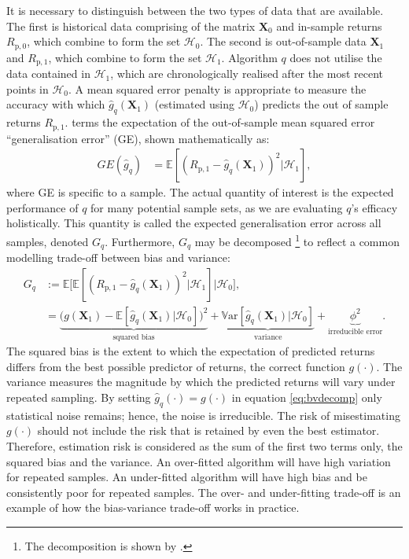 \documentclass[
]{article}
\begin{document}
It is necessary to distinguish between the two types of data that are available. The first is
historical data comprising of the matrix \(\textbf{X}_0\) and in-sample returns \(R_{\mathrm{p}, 0}\),
which combine to form the set \(\mathcal{H}_0\). The second is out-of-sample data \(\textbf{X}_1\) and
\(R_\mathrm{p, 1}\), which combine to form the set \(\mathcal{H}_1\). Algorithm \(q\) does not utilise the
data contained in \(\mathcal{H}_1\), which are chronologically realised after the most recent points in
\(\mathcal{H}_0\). A mean squared error penalty is appropriate to measure the accuracy with which
\(\hat{g}_q (\textbf{X}_1)\) (estimated using \(\mathcal{H}_0\)) predicts the out of sample returns
\(R_\mathrm{p, 1}\). \citet{K18} terms the expectation of the out-of-sample mean squared error
``generalisation error'' (GE), shown mathematically as:
\begin{align}
GE(\hat{g}_q) & = \mathbb{E}[(R_\mathrm{p, 1} - \hat{g}_q (\textbf{X}_1))^2|{\mathcal{H}_1}],
\end{align}
where GE is specific to a sample. The actual quantity of interest is the expected performance of \(q\)
for many potential sample sets, as we are evaluating \(q\)'s efficacy holistically. This quantity is
called the expected generalisation error across all samples, denoted \(G_q\). Furthermore, \(G_q\) may be
decomposed \footnote{The decomposition is shown by \citet{FHT01}.} to reflect a common modelling trade-off between
bias and variance:
\begin{align}
G_q &:= \mathbb{E} \Big [ \mathbb{E}[(R_\mathrm{p, 1} - \hat{g}_q (\textbf{X}_1))^2|{\mathcal{H}_1}] \Big | \mathcal{H}_0\Big ] , \\
& = \underbrace{ \Big (g(\textbf{X}_1) - \mathbb{E}[\hat{g}_q (\textbf{X}_1)|\mathcal{H}_0] \Big )^2}_{\text{squared bias}} + \underbrace{\mathbb{V}\mathrm{ar} [\hat{g}_q(\textbf{X}_1)|\mathcal{H}_0]}_{\text{variance}} + \underbrace{\phi^2}_{\text{irreducible error}}.\label{eq:bvdecomp}
\end{align}
The squared bias is the extent to which the expectation of predicted returns differs from the best
possible predictor of returns, the correct function \(g(\cdot)\). The variance measures the magnitude
by which the predicted returns will vary under repeated sampling. By setting
\(\hat{g}_q(\cdot) = g(\cdot)\) in equation \eqref{eq:bvdecomp} only statistical noise remains; hence,
the noise is irreducible. The risk of misestimating \(g(\cdot)\) should not include the risk that is
retained by even the best estimator. Therefore, estimation risk is considered as the sum of the first
two terms only, the squared bias and the variance. An over-fitted algorithm will have high variation
for repeated samples. An under-fitted algorithm will have high bias and be consistently poor for
repeated samples. The over- and under-fitting trade-off is an example of how the bias-variance
trade-off works in practice.
\end{document}
